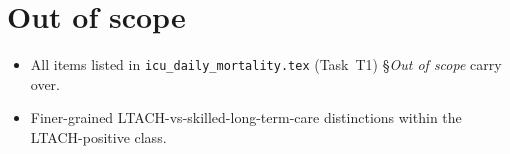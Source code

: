 \documentclass[11pt]{article}
\begin{document}
\section{Out of scope}

\begin{itemize}[leftmargin=2em]
  \item All items listed in \texttt{icu\_daily\_mortality.tex}
        (Task~T1) \S\textit{Out of scope} carry over.
  \item Finer-grained LTACH-vs-skilled-long-term-care distinctions
        within the LTACH-positive class.
\end{itemize}



\end{document}

